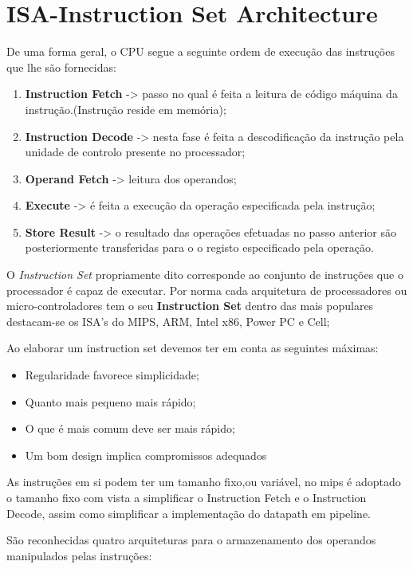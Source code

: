 \documentclass[10pt,a4paper]{book}
\begin{document}
 \chapter{ISA-Instruction Set Architecture}

	De uma forma geral, o CPU segue a seguinte ordem de execução das instruções que lhe são fornecidas:
		\begin{enumerate}
			\item \textbf{Instruction Fetch} -> passo no qual é feita a leitura de código máquina da instrução.(Instrução reside em memória);
			\item \textbf{Instruction Decode} -> nesta fase é feita a descodificação da instrução pela unidade de controlo presente no processador;
			\item \textbf{Operand Fetch} -> leitura dos operandos;
			\item \textbf{Execute} -> é feita a execução da operação especificada pela instrução;
			\item \textbf{Store Result} -> o resultado das operações efetuadas no passo anterior são posteriormente transferidas para o o registo especificado pela operação.
		\end{enumerate}

	O \textit{Instruction Set} propriamente dito corresponde ao conjunto de instruções que o processador é capaz de executar.
	Por norma cada arquitetura de processadores ou micro-controladores tem o seu \textbf{Instruction Set} dentro das mais populares destacam-se os ISA's do MIPS, ARM, Intel x86, Power PC e Cell;

	Ao elaborar um instruction set devemos ter em conta as seguintes máximas:
	\begin{itemize}
		\item Regularidade favorece simplicidade;
		\item Quanto mais pequeno mais rápido;
		\item O que é mais comum deve ser mais rápido;
		\item Um bom design implica compromissos adequados
	\end{itemize}

	As instruções em si podem ter um tamanho fixo,ou variável, no mips é adoptado o tamanho fixo com vista a simplificar o Instruction Fetch e o Instruction Decode, assim como simplificar a implementação do datapath em pipeline.

  São reconhecidas quatro arquiteturas para o armazenamento dos operandos manipulados pelas instruções:
\end{document}
